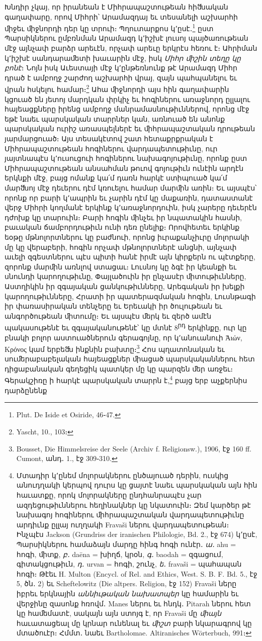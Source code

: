 \documentclass{article}
\begin{document}
{Խնդիր չկայ, որ իրանեան է Միհրապաշտութեան հիﬓական գաղափարը, որով Միհրի՝ Արամազդայ եւ տեսանելի աշխարհի ﬕջեւ ﬕջնորդի դեր կը տրուի։ Պղուտարքոս կ՚ըսէ․\footnote{Plut. De Iside et Osiride, 46֊47.} ըստ Պարսիկներու ըմբռնման Արամազդ կ՚իշխէ լուսոյ պայծառութեան մէջ այնչափ բարձր արեւէն, որչափ արեւը երկրէս հեռու է։ Ահրիման կ՚իշխէ սանդարաﬔտի խաւարին մէջ, իսկ \emph{Միհր ﬕշին տեղը կը բոնէ}։ Նոյն իսկ Աւեստայի մէջ կ՚ընթեռնունք թէ Արամազդ Միհր դրած է ամբողջ շարժող աշխարհի վրայ, զայն պահպանելու եւ վրան հսկելու համար։\footnote{Yascht, 10., 103։} Ահա ﬕջնորդի այս հին գաղափարին կցուած են յետոյ մարդկան փրկիչ եւ հոգիներու առաջնորդ ըլլալու հայեացքները իրենց ամբողջ մանրամասնութիւններով, որոնց մէջ եթէ նաեւ պարսկական տարրներ կան, առնուած են անոնք պարսկական ուրիշ առասպելներէ եւ ﬕհրապաշտական դրութեան յարմարցուած։ Այս տեսակէտով շատ հետաքրքրական է Միհրապաշտութեան հոգիներու վարդապետութիւնը, ուր յայտնապէս կ՚ուսուցուի հոգիներու նախագոյութիւնը, որոնք ըստ Միհրապաշտութեան անսահման թուով գոյութիւն ունէին արդէն երկնքի մէջ, բայց ոմանք կա՛մ դառն հարկէ ստիպուած կա՛մ մարﬓոյ մէջ դեւերու դէմ կռուելու համար մարﬕն առին։ Եւ այսպէս՝ որոնք որ բարի կ՚ապրին եւ չարին դէմ կը մաքառին, դատաստանէ վերջ Միհրի կողմանէ երկինք կ՚առաջնորդուին, իսկ չարերը դեւերէն դժոխք կը տարուին։ Բարի հոգին ﬕնչեւ իր նպատակին հասնի, բաւական ճամբորդութիւն ունի դեռ ընելիք։ Որովհետեւ երկինք եօթը մթնոլորտներու կը բաժնուի, որոնց իւրաքանչիւրը մոլորակի մը կը վերաբերի, հոգին որչափ մթնոլորտներէ անցնի, այնչափ աւելի զգեստներու պէս պիտի հանէ իրմէ այն կիրքերն ու պէտքերը, զորոնք մարﬕն առնլով ստացաւ։ Լուսնոյ կը ձգէ իր կեանքի եւ սնունդի կարողութիւնը, Փայլածուին իր ընչասէր ﬕտութիւնները, Աստղիկին իր զգայական ցանկութիւնները, Արեգական իր խելքի կարողութիւնները, Հրատի իր պատերազմական հոգին, Լուսնթագի իր փառասիրական տենչերը եւ Երեւակի իր ծուլութեան եւ անգործութեան ﬕտումը։ Եւ այսպէս ﬔրկ եւ զերծ ամէն պակասութենէ եւ զգայականութենէ՝ կը մտնէ 8\textsuperscript{րդ} երկինքը, ուր կը բնակի բոլոր աստուածներուն գերագոյնը, որ կ՚անուանուի Ἀιών, Κρόνος կամ երբեﬓ ինքնին բախտը։\footnote{Bousset, Die Himmelsreise der Seele (Archiv f. Religionsw.), 1906, էջ 160 ff. Cumont, անդ․ 1., էջ 309֊310.} Հոս պղատոնական եւ սուﬔրաբաբելական հայեացքներ ﬕացած պարսկականներու հետ դիցաբանական գեղեցիկ պատկեր մը կը պարզեն ﬔր առջեւ։ Գերակշիռը ի հարկէ պարսկական տարրն է,\footnote{Մտադիր կ՚ընեմ մոլորակներու ընծայուած դերին, ուսկից անուդղակի կերպով դուրս կը ցայտէ նաեւ պարսկական այն հին հաւատքը, որոկ մոլորակները ընդհանրապէս չար ազդեցութիւններու հեղինակներ կը նկատուին։ Զեմ կարծեր թէ նախագոյ հոգիներու ﬕհրապաշտական վարդապետութիւնը արդիւնք ըլլայ ուղղակի Fravaši ներու վարդապետութեան։ Ինչպէս Jackson (Grundriss der iranischen Philologie, Bd. 2., էջ 674) կ՚ըսէ, Պարսիկներու համաձայն մարդը հինգ հոգի ունէր․ \emph{ա․} ahu = հոգի, ﬕտք, \emph{բ․} daēna = խիղճ, կրօն, \emph{գ․} baodah = զգացում, գիտակցութիւն, \emph{դ․} urvan = հոգի, շունչ, \emph{ե․} fravaši = պահապան հոգի։ Թէեւ H. Multon (Encycl. of Rel. and Ethics, West. S. B. F. Bd. 5., էջ 5, ծն․ 2) եւ Scheftelowitz (Die altpers. Religion, էջ 152) Fravaši ները իբրեւ երկնային \emph{աննիւթական նախատպեր} կը համարին եւ վերջինը զասոնք հռովմ․ Manes ներու եւ հնդկ․ Pitarah ներու հետ կը հաﬔմատէ, սակայն այն ստոյգ է, որ Fravaši մը \emph{ﬕայն} հաւատացեալ մը կրնար ունենալ եւ \emph{ﬕշտ} բարի նկարագրով կը մտածուէր։ Հմմտ․ նաեւ Bartholomae. Altiranisches Wörterbuch, 991։} բայց երբ աչքերնիս դարձընենք }
\end{document}
